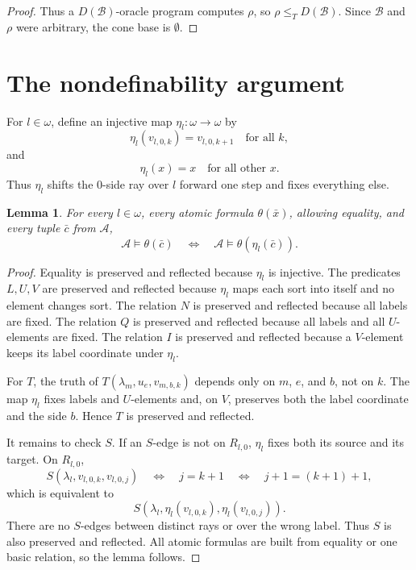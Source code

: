 \documentclass[12pt]{article}
\newtheorem{lemma}[theorem]{Lemma}
\theoremstyle{definition}
\theoremstyle{remark}
\begin{document}
\begin{proof}
Thus a \(D(\mathcal B)\)-oracle program computes \(\rho\), so \(\rho\leq_TD(\mathcal B)\).  Since \(\mathcal B\) and \(\rho\) were arbitrary, the cone base is \(\emptyset\).
\end{proof}

\section{The nondefinability argument}\label{sec:nondef}

For \(l\in\omega\), define an injective map \(\eta_l:\omega\to\omega\) by
\[
\eta_l(v_{l,0,k})=v_{l,0,k+1}
\quad\text{for all }k,
\]
and
\[
\eta_l(x)=x
\quad\text{for all other }x.
\]
Thus \(\eta_l\) shifts the \(0\)-side ray over \(l\) forward one step and fixes everything else.

\begin{lemma}\label{lem:eta-atomic}
For every \(l\in\omega\), every atomic formula \(\theta(\bar x)\), allowing equality, and every tuple \(\bar c\) from \(\mathcal A\),
\[
\mathcal A\models \theta(\bar c)
\quad\Longleftrightarrow\quad
\mathcal A\models \theta(\eta_l(\bar c)).
\]
\end{lemma}

\begin{proof}
Equality is preserved and reflected because \(\eta_l\) is injective.  The predicates \(L,U,V\) are preserved and reflected because \(\eta_l\) maps each sort into itself and no element changes sort.  The relation \(N\) is preserved and reflected because all labels are fixed.  The relation \(Q\) is preserved and reflected because all labels and all \(U\)-elements are fixed.  The relation \(I\) is preserved and reflected because a \(V\)-element keeps its label coordinate under \(\eta_l\).

For \(T\), the truth of \(T(\lambda_m,u_e,v_{m,b,k})\) depends only on \(m\), \(e\), and \(b\), not on \(k\).  The map \(\eta_l\) fixes labels and \(U\)-elements and, on \(V\), preserves both the label coordinate and the side \(b\).  Hence \(T\) is preserved and reflected.

It remains to check \(S\).  If an \(S\)-edge is not on \(R_{l,0}\), \(\eta_l\) fixes both its source and its target.  On \(R_{l,0}\),
\[
S(\lambda_l,v_{l,0,k},v_{l,0,j})
\quad\Longleftrightarrow\quad
j=k+1
\quad\Longleftrightarrow\quad
j+1=(k+1)+1,
\]
which is equivalent to
\[
S(\lambda_l,\eta_l(v_{l,0,k}),\eta_l(v_{l,0,j})).
\]
There are no \(S\)-edges between distinct rays or over the wrong label.  Thus \(S\) is also preserved and reflected.  All atomic formulas are built from equality or one basic relation, so the lemma follows.
\end{proof}
\end{document}
